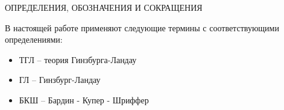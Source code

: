 \begin{center}
	ОПРЕДЕЛЕНИЯ, ОБОЗНАЧЕНИЯ И СОКРАЩЕНИЯ
\end{center}

В настоящей работе применяют следующие термины с соответствующими определениями:
\begin{itemize}
    \item ТГЛ -- теория Гинзбурга-Ландау
    \item ГЛ -- Гинзбург-Ландау
    \item БКШ -- Бардин - Купер - Шриффер
\end{itemize}

\newpage